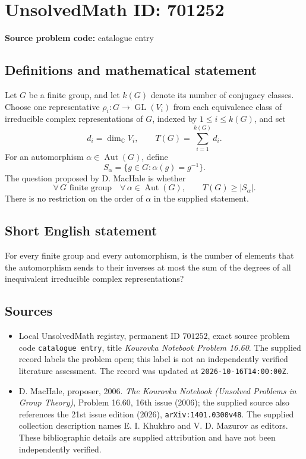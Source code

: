\documentclass[11pt]{article}
\newcommand{\C}{\mathbb{C}}
\begin{document}
\section*{UnsolvedMath ID: 701252}
\textbf{Source problem code:} catalogue entry
\subsection{Definitions and mathematical statement}
Let \(G\) be a finite group, and let \(k(G)\) denote its number of conjugacy classes. Choose one representative \(\rho_i\colon G\to\operatorname{GL}(V_i)\) from each equivalence class of irreducible complex representations of \(G\), indexed by \(1\leq i\leq k(G)\), and set
\[
d_i=\dim_{\C}V_i,\qquad T(G)=\sum_{i=1}^{k(G)}d_i.
\]
For an automorphism \(\alpha\in\operatorname{Aut}(G)\), define
\[
S_{\alpha}=\{g\in G:\alpha(g)=g^{-1}\}.
\]
The question proposed by D. MacHale is whether
\[
\forall\,G\text{ finite group}\quad\forall\,\alpha\in\operatorname{Aut}(G),\qquad T(G)\geq |S_{\alpha}|.
\]
There is no restriction on the order of \(\alpha\) in the supplied statement.
\subsection{Short English statement}
For every finite group and every automorphism, is the number of elements that the automorphism sends to their inverses at most the sum of the degrees of all inequivalent irreducible complex representations?
\subsection{Sources}
\begin{itemize}
\item Local UnsolvedMath registry, permanent ID \(701252\), exact source problem code \texttt{catalogue entry}, title \emph{Kourovka Notebook Problem 16.60}. The supplied record labels the problem open; this label is not an independently verified literature assessment. The record was updated at \texttt{2026-10-16T14:00:00Z}.
\item D. MacHale, proposer, 2006. \emph{The Kourovka Notebook (Unsolved Problems in Group Theory)}, Problem 16.60, 16th issue (2006); the supplied source also references the 21st issue edition (2026), \texttt{arXiv:1401.0300v48}. The supplied collection description names E. I. Khukhro and V. D. Mazurov as editors. These bibliographic details are supplied attribution and have not been independently verified.
\end{itemize}
\end{document}
